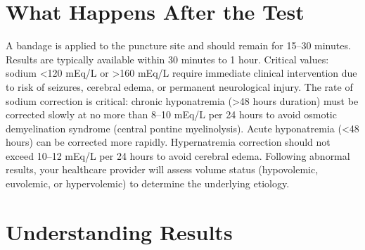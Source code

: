 \section*{What Happens After the Test}
A bandage is applied to the puncture site and should remain for 15--30 minutes. Results are typically available within 30 minutes to 1 hour. Critical values: sodium <120 mEq/L or >160 mEq/L require immediate clinical intervention due to risk of seizures, cerebral edema, or permanent neurological injury. The rate of sodium correction is critical: chronic hyponatremia (>48 hours duration) must be corrected slowly at no more than 8--10 mEq/L per 24 hours to avoid osmotic demyelination syndrome (central pontine myelinolysis). Acute hyponatremia (<48 hours) can be corrected more rapidly. Hypernatremia correction should not exceed 10--12 mEq/L per 24 hours to avoid cerebral edema. Following abnormal results, your healthcare provider will assess volume status (hypovolemic, euvolemic, or hypervolemic) to determine the underlying etiology.

\section*{Understanding Results}

